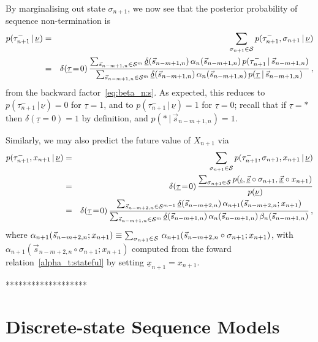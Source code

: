 \documentclass[a4paper]{article}
\newcommand{\uv}{\underline{\nu}}
\newcommand{\ui}{\underline{\iota}}
\newcommand{\ut}{\underline{\tau}}
\newcommand{\tm}{\tau^{-}}
\newcommand{\vs}{\vec{s}}
\newcommand{\uvs}{\underline{\vs}}
\newcommand{\vx}{\vec{x}}
\newcommand{\uvx}{\underline{\vx}}
\newcommand{\ux}{\underline{x}}
\newcommand{\ud}{\underline{\delta}}
\begin{document}
By marginalising out state $\sigma_{n+1}$, we now see that the posterior probability of sequence non-termination is 
\begin{eqnarray}
 p(\tm_{n+1}\,|\,\uv)  
& = &
 \sum_{\sigma_{n+1}\in{\cal S}} p(\tm_{n+1},\sigma_{n+1}\,|\,\uv)  
\nonumber\\& = &
  \delta(\ut\!=\!0)\,
  \frac{\sum_{\vs_{n-m+1,n}\in{\cal S}^{m}} \ud(\vs_{n-m+1,n})
\,\alpha_n(\vs_{n-m+1,n})\,p(\tm_{n+1}\,|\,\vs_{n-m+1,n})}
 {\sum_{\vs_{n-m+1,n}\in{\cal S}^{m}} \ud(\vs_{n-m+1,n})
\,\alpha_n(\vs_{n-m+1,n})\,p(\ut\,|\,\vs_{n-m+1,n})}
\,,
\end{eqnarray}
from the backward factor~\eqref{eq:beta_n:s}.
As expected, this reduces to $p(\tm_{n+1}\,|\,\uv)=0$ for $\ut=1$, and to $p(\tm_{n+1}\,|\,\uv)=1$ for $\ut=0$;
recall that if $\ut=*$ then $\delta(\ut\!=\!0)=1$ by definition, and $p(*\,|\,\vs_{n-m+1,n})=1$.

Similarly, we may also predict the future value of $X_{n+1}$ via
\begin{eqnarray}
 p(\tm_{n+1},x_{n+1}\,|\,\uv)  
& = &
 \sum_{\sigma_{n+1}\in{\cal S}} p(\tm_{n+1},\sigma_{n+1},x_{n+1}\,|\,\uv)  
\nonumber\\& = &
  \delta(\ut\!=\!0)\,
  \frac{ \sum_{\sigma_{n+1}\in{\cal S}} p(\ui,\uvs\circ\sigma_{n+1},\uvx\circ x_{n+1})}
       {p(\uv)}
\nonumber\\& = & 
  \delta(\ut\!=\!0)\,
  \frac{\sum_{\vs_{n-m+2,n}\in{\cal S}^{m-1}} \ud(\vs_{n-m+2,n})
\,\alpha_{n+1}(\vs_{n-m+2,n};x_{n+1})}
 {\sum_{\vs_{n-m+1,n}\in{\cal S}^{m}} \ud(\vs_{n-m+1,n})
\,\alpha_n(\vs_{n-m+1,n})\,\beta_n(\vs_{n-m+1,n})}
\,,
\end{eqnarray}
where
$\alpha_{n+1}(\vs_{n-m+2,n};x_{n+1})\equiv\sum_{\sigma_{n+1}\in{\cal S}}
\,\alpha_{n+1}(\vs_{n-m+2,n}\circ\sigma_{n+1};x_{n+1})$,
with
$\alpha_{n+1}(\vs_{n-m+2,n}\circ\sigma_{n+1};x_{n+1})$ computed from the foward relation~\eqref{alpha_t:stateful}
by setting $\ux_{n+1}=x_{n+1}$.

*******************

\section{Discrete-state Sequence Models}\label{sec:discrete-state}
\end{document}
